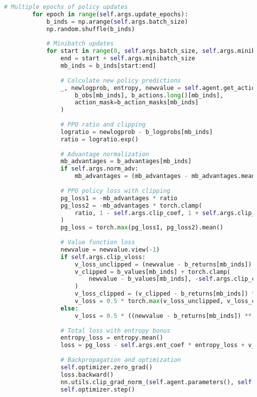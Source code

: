 \documentclass[12pt,a4paper]{article}
\begin{document}
\begin{lstlisting}[language=Python, caption=PPO Trainer Core Logic]
        # Multiple epochs of policy updates
        for epoch in range(self.args.update_epochs):
            b_inds = np.arange(self.args.batch_size)
            np.random.shuffle(b_inds)
            
            # Minibatch updates
            for start in range(0, self.args.batch_size, self.args.minibatch_size):
                end = start + self.args.minibatch_size
                mb_inds = b_inds[start:end]
                
                # Calculate new policy predictions
                _, newlogprob, entropy, newvalue = self.agent.get_action_and_value(
                    b_obs[mb_inds], b_actions.long()[mb_inds], 
                    action_mask=b_action_masks[mb_inds]
                )
                
                # PPO ratio and clipping
                logratio = newlogprob - b_logprobs[mb_inds]
                ratio = logratio.exp()
                
                # Advantage normalization
                mb_advantages = b_advantages[mb_inds]
                if self.args.norm_adv:
                    mb_advantages = (mb_advantages - mb_advantages.mean()) / (mb_advantages.std() + 1e-8)
                
                # PPO policy loss with clipping
                pg_loss1 = -mb_advantages * ratio
                pg_loss2 = -mb_advantages * torch.clamp(
                    ratio, 1 - self.args.clip_coef, 1 + self.args.clip_coef
                )
                pg_loss = torch.max(pg_loss1, pg_loss2).mean()
                
                # Value function loss
                newvalue = newvalue.view(-1)
                if self.args.clip_vloss:
                    v_loss_unclipped = (newvalue - b_returns[mb_inds]) ** 2
                    v_clipped = b_values[mb_inds] + torch.clamp(
                        newvalue - b_values[mb_inds], -self.args.clip_coef, self.args.clip_coef
                    )
                    v_loss_clipped = (v_clipped - b_returns[mb_inds]) ** 2
                    v_loss = 0.5 * torch.max(v_loss_unclipped, v_loss_clipped).mean()
                else:
                    v_loss = 0.5 * ((newvalue - b_returns[mb_inds]) ** 2).mean()
                
                # Total loss with entropy bonus
                entropy_loss = entropy.mean()
                loss = pg_loss - self.args.ent_coef * entropy_loss + v_loss * self.args.vf_coef
                
                # Backpropagation and optimization
                self.optimizer.zero_grad()
                loss.backward()
                nn.utils.clip_grad_norm_(self.agent.parameters(), self.args.max_grad_norm)
                self.optimizer.step()
\end{lstlisting}
\end{document}
